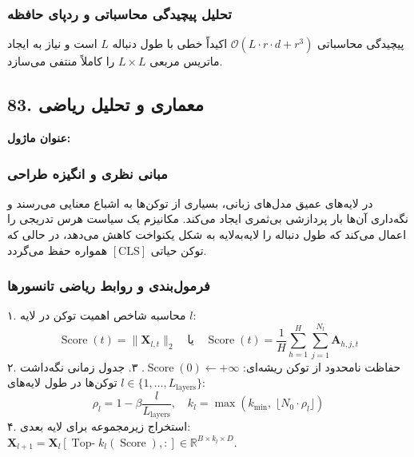 \subsubsection*{تحلیل پیچیدگی محاسباتی و ردپای حافظه}
پیچیدگی محاسباتی $\mathcal{O}(L \cdot r \cdot d + r^3)$ اکیداً خطی با طول دنباله $L$ است و نیاز به ایجاد ماتریس مربعی $L \times L$ را کاملاً منتفی می‌سازد.


\subsection*{83. معماری و تحلیل ریاضی }
\textbf{عنوان ماژول:} 

\subsubsection*{مبانی نظری و انگیزه طراحی}
در لایه‌های عمیق مدل‌های زبانی، بسیاری از توکن‌ها به اشباع معنایی می‌رسند و نگه‌داری آن‌ها بار پردازشی بی‌ثمری ایجاد می‌کند. مکانیزم  یک سیاست هرس تدریجی را اعمال می‌کند که طول دنباله را لایه‌به‌لایه به شکل یکنواخت کاهش می‌دهد، در حالی که توکن حیاتی $[\text{CLS}]$ همواره حفظ می‌گردد.

\subsubsection*{فرمول‌بندی و روابط ریاضی تانسورها}
۱. محاسبه شاخص اهمیت توکن در لایه $l$:
\begin{equation}
\operatorname{Score}(t) = \|\mathbf{X}_{l, t}\|_2 \quad \text{یا} \quad \operatorname{Score}(t) = \frac{1}{H} \sum_{h=1}^H \sum_{j=1}^{N_l} \mathbf{A}_{h, j, t}
\end{equation}
۲. حفاظت نامحدود از توکن ریشه‌ای: $\operatorname{Score}(0) \leftarrow +\infty$.
۳. جدول زمانی نگه‌داشت توکن‌ها در طول لایه‌های $l \in \{1, \dots, L_{\text{layers}}\}$:
\begin{equation}
\rho_l = 1 - \beta \frac{l}{L_{\text{layers}}}, \quad k_l = \max\left(k_{\min}, \; \lfloor N_0 \cdot \rho_l \rfloor\right)
\end{equation}
۴. استخراج زیرمجموعه برای لایه بعدی: $\mathbf{X}_{l+1} = \mathbf{X}_l[\operatorname{Top-}k_l(\operatorname{Score}), :] \in \mathbb{R}^{B \times k_l \times D}$.

